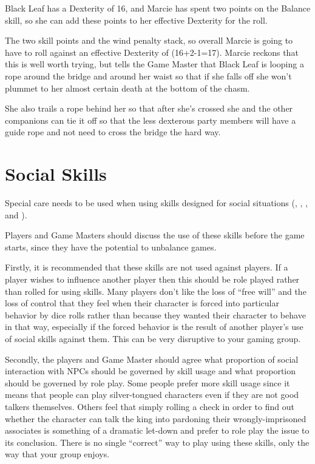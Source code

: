 \begin{multicols*}{2}
{Black Leaf has a Dexterity of 16, and Marcie has spent two points on the Balance skill, so she can add these points to her effective Dexterity for the roll.

The two skill points and the wind penalty stack, so overall Marcie is going to have to roll against an effective Dexterity of (16+2-1=17). Marcie reckons that this is well worth trying, but tells the Game Master that Black Leaf is looping a rope around the bridge and around her waist so that if she falls off she won’t plummet to her almost certain death at the bottom of the chasm.

She also trails a rope behind her so that after she’s crossed she and the other companions can tie it off so that the less dexterous party members will have a guide rope and not need to cross the bridge the hard way.}

\section{Social Skills}
Special care needs to be used when using skills designed for social situations (, , , and ).

Players and Game Masters should discuss the use of these skills before the game starts, since they have the potential to unbalance games.

Firstly, it is recommended that these skills are not used against players. If a player wishes to influence another player then this should be role played rather than rolled for using skills. Many players don’t like the loss of “free will” and the loss of control that they feel when their character is forced into particular behavior by dice rolls rather than because they wanted their character to behave in that way, especially if the forced behavior is the result of another player’s use of social skills against them. This can be very disruptive to your gaming group.

Secondly, the players and Game Master should agree what proportion of social interaction with NPCs should be governed by skill usage and what proportion should be governed by role play. Some people prefer more skill usage since it means that people can play silver-tongued characters even if they are not good talkers themselves. Others feel that simply rolling a  check in order to find out whether the character can talk the king into pardoning their wrongly-imprisoned associates is something of a dramatic let-down and prefer to role play the issue to its conclusion. There is no single “correct” way to play using these skills, only the way that your group enjoys.


\end{multicols*}
